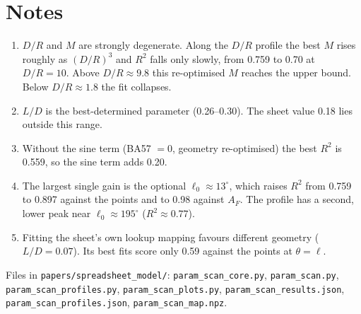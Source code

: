 \documentclass[10pt]{article}
\begin{document}
\section{Notes}
\begin{enumerate}\setlength{\itemsep}{1pt}
\item $D/R$ and $M$ are strongly degenerate. Along the $D/R$ profile the best $M$ rises roughly as $(D/R)^{3}$ and $R^2$ falls only slowly, from 0.759 to 0.70 at $D/R=10$. Above $D/R\approx9.8$ this re-optimised $M$ reaches the upper bound. Below $D/R\approx1.8$ the fit collapses.
\item $L/D$ is the best-determined parameter (0.26--0.30). The sheet value 0.18 lies outside this range.
\item Without the sine term (BA57 $=0$, geometry re-optimised) the best $R^2$ is 0.559, so the sine term adds 0.20.
\item The largest single gain is the optional $\ell_0\approx13^\circ$, which raises $R^2$ from 0.759 to 0.897 against the points and to 0.98 against $A_F$. The profile has a second, lower peak near $\ell_0\approx195^\circ$ ($R^2\approx0.77$).
\item Fitting the sheet's own lookup mapping favours different geometry ($L/D=0.07$). Its best fits score only 0.59 against the points at $\theta=\ell$.
\end{enumerate}

\sloppy\footnotesize Files in \texttt{papers/spreadsheet\_model/}: \texttt{param\_scan\_core.py}, \texttt{param\_scan.py}, \texttt{param\_scan\_profiles.py}, \texttt{param\_scan\_plots.py}, \texttt{param\_scan\_results.json}, \texttt{param\_scan\_profiles.json}, \texttt{param\_scan\_map.npz}.
\end{document}
